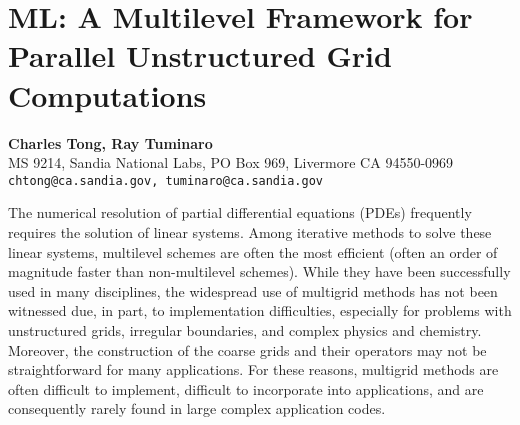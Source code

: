 \documentclass[11pt]{article}
\newcommand{\nextab}[4]{
	\section{#2}
	{\bf #1} \\ \nopagebreak
	{#3} \\ \nopagebreak
	{\tt #4} \nopagebreak
	}
\begin{document}
\nextab{Charles Tong, Ray Tuminaro}
	{ML: A Multilevel Framework for Parallel Unstructured
		Grid Computations}
	{MS 9214, Sandia National Labs, PO Box 969, Livermore CA 94550-0969}
	{chtong@ca.sandia.gov, tuminaro@ca.sandia.gov}

The numerical resolution of partial differential equations (PDEs)
frequently requires the solution of linear systems.
Among iterative methods
to solve these linear systems, multilevel schemes are often the
most efficient (often an order of magnitude faster than non-multilevel
schemes). While they have been successfully used in many disciplines,
the widespread use of multigrid methods has not been witnessed due, in part,
to implementation difficulties, especially for problems with unstructured
grids, irregular boundaries, and complex physics and chemistry.  Moreover,
the construction of the coarse grids and their operators may not be
straightforward for many applications.  For these reasons, multigrid
methods are often difficult to implement, difficult to incorporate
into applications, and are consequently rarely found in large
complex application codes.
\end{document}
